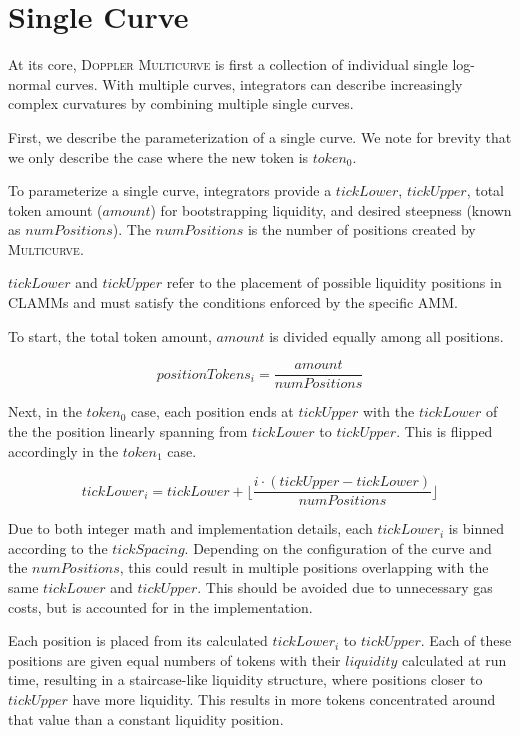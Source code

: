 \documentclass[sigconf,nonacm,prologue,table]{acmart}
\numberwithin{equation}{section}
\theoremstyle{definition}
\theoremstyle{remark}
\begin{document}
\section{Single Curve} 
\label{sec:single}

At its core, \textsc{Doppler Multicurve} is first a collection of individual single log-normal curves. With multiple curves, integrators can describe increasingly complex curvatures by combining multiple single curves.

First, we describe the parameterization of a single curve. We note for brevity that we only describe the case where the new token is $token_0$.

To parameterize a single curve, integrators provide a $tickLower$, $tickUpper$, total token amount ($amount$) for bootstrapping liquidity, and desired steepness (known as $numPositions$). The $numPositions$ is the number of positions created by \textsc{Multicurve}.

$tickLower$ and $tickUpper$ refer to the placement of possible liquidity positions in CLAMMs and must satisfy the conditions enforced by the specific AMM.

To start, the total token amount, $amount$ is divided equally among all positions.

\begin{equation}
    positionTokens_i = \frac{amount}{numPositions}
\end{equation}

Next, in the $token_0$ case, each position ends at $tickUpper$ with the $tickLower$ of the the position linearly spanning from $tickLower$ to $tickUpper$. This is flipped accordingly in the $token_1$ case.

\begin{equation}
    tickLower_i = tickLower +  \lfloor \frac{i \cdot (tickUpper - tickLower)}{numPositions} \rfloor
\end{equation}

Due to both integer math and implementation details, each $tickLower_i$ is binned according to the $tickSpacing$. Depending on the configuration of the curve and the $numPositions$, this could result in multiple positions overlapping with the same $tickLower$ and $tickUpper$. This should be avoided due to unnecessary gas costs, but is accounted for in the implementation. 

Each position is placed from its calculated $tickLower_i$ to $tickUpper$. Each of these positions are given equal numbers of tokens with their $liquidity$ calculated at run time, resulting in a staircase-like liquidity structure, where positions closer to $tickUpper$ have more liquidity. This results in more tokens concentrated around that value than a constant liquidity position.
\end{document}

